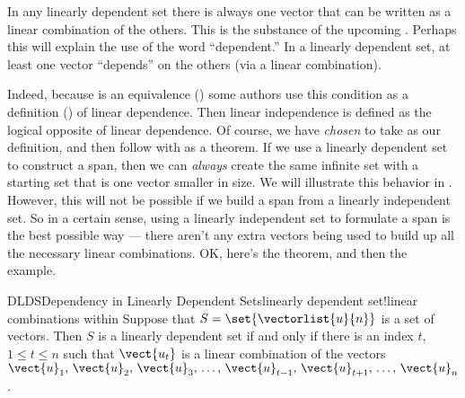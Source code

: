 %
In any linearly dependent set there is always one vector that can be written as a linear combination of the others.  This is the substance of the upcoming .  Perhaps this will explain the use of the word ``dependent.''  In a linearly dependent set, at least one vector ``depends'' on the others (via a linear combination).\par
%
Indeed, because  is an equivalence () some authors use this condition as a definition () of linear dependence.  Then linear independence is defined as the logical opposite of linear dependence.  Of course, we have {\em chosen} to take  as our definition, and then follow with  as a theorem.
%
%
If we use a linearly dependent set to construct a span, then we can {\em always} create the same infinite set with a starting set that is one vector smaller in size.  We will illustrate this behavior in .  However, this will not be possible if we build a span from a linearly independent set.  So in a certain sense, using a linearly independent set to formulate a span is the best possible way --- there aren't any extra vectors being used to build up all the necessary linear combinations.  OK, here's the theorem, and then the example.
%
\begin{theorem}{DLDS}{Dependency in Linearly Dependent Sets}{linearly dependent set!linear combinations within}
Suppose that $S=\set{\vectorlist{u}{n}}$ is a set of vectors.  Then $S$ is a linearly dependent set if and only if there is an index $t$, $1\leq t\leq n$ such that $\vect{u_t}$ is a linear combination of the vectors $\vect{u}_1,\,\vect{u}_2,\,\vect{u}_3,\,\ldots,\,\vect{u}_{t-1},\,\vect{u}_{t+1},\,\ldots,\,\vect{u}_n$.
\end{theorem}
%
